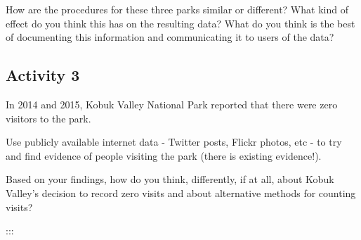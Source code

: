 \documentclass[
  letterpaper,
  DIV=11,
  numbers=noendperiod]{scrartcl}
\begin{document}
How are the procedures for these three parks similar or different? What
kind of effect do you think this has on the resulting data? What do you
think is the best of documenting this information and communicating it
to users of the data?

\subsection{Activity 3}\label{activity-3}

In 2014 and 2015, Kobuk Valley National Park reported that there were
zero visitors to the park.

Use publicly available internet data - Twitter posts, Flickr photos, etc
- to try and find evidence of people visiting the park (there is
existing evidence!).

Based on your findings, how do you think, differently, if at all, about
Kobuk Valley's decision to record zero visits and about alternative
methods for counting visits?

:::
\end{document}
